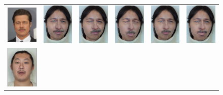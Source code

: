 \begin{figure}
\begin{tabular}{cccccc}
\includegraphics[width=.1535\textwidth]{figures/results/pitt_on_yi/pitt.jpg}&
\includegraphics[width=.1535\textwidth]{figures/results/pitt_on_yi/composite000002.png}&
\includegraphics[width=.1535\textwidth]{figures/results/pitt_on_yi/composite000003.png}&
\includegraphics[width=.1535\textwidth]{figures/results/pitt_on_yi/composite000004.png}&
\includegraphics[width=.1535\textwidth]{figures/results/pitt_on_yi/composite000001.png}&
\includegraphics[width=.1535\textwidth]{figures/results/pitt_on_yi/composite000006.png}\\
\includegraphics[width=.1535\textwidth]{figures/results/kat_on_zimo/000284.jpg}&

\end{tabular}
\end{figure}
